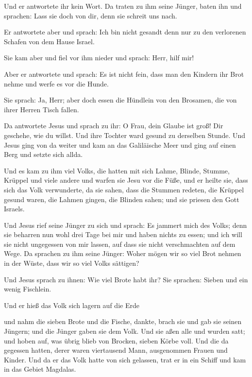  Und er antwortete ihr kein Wort. Da traten zu ihm seine
Jünger, baten ihn und sprachen: Lass sie doch von dir, denn sie schreit
uns nach.

 Er antwortete aber und sprach: Ich bin nicht gesandt
denn nur zu den verlorenen Schafen von dem Hause Israel.

 Sie kam aber und fiel vor ihm nieder und sprach: Herr,
hilf mir!

 Aber er antwortete und sprach: Es ist nicht fein, dass
man den Kindern ihr Brot nehme und werfe es vor die Hunde.

 Sie sprach: Ja, Herr; aber doch essen die Hündlein von
den Brosamen, die von ihrer Herren Tisch fallen.

 Da antwortete Jesus und sprach zu ihr: O Frau, dein
Glaube ist groß! Dir geschehe, wie du willst. Und ihre Tochter ward
gesund zu derselben Stunde.  Und Jesus ging von da weiter
und kam an das Galiläische Meer und ging auf einen Berg und setzte sich
allda.

 Und es kam zu ihm viel Volks, die hatten mit sich Lahme,
Blinde, Stumme, Krüppel und viele andere und warfen sie Jesu vor die
Füße, und er heilte sie,  dass sich das Volk verwunderte,
da sie sahen, dass die Stummen redeten, die Krüppel gesund waren, die
Lahmen gingen, die Blinden sahen; und sie priesen den Gott Israels.

 Und Jesus rief seine Jünger zu sich und sprach: Es
jammert mich des Volks; denn sie beharren nun wohl drei Tage bei mir und
haben nichts zu essen; und ich will sie nicht ungegessen von mir lassen,
auf dass sie nicht verschmachten auf dem Wege.  Da
sprachen zu ihm seine Jünger: Woher mögen wir so viel Brot nehmen in der
Wüste, dass wir so viel Volks sättigen?

 Und Jesus sprach zu ihnen: Wie viel Brote habt ihr? Sie
sprachen: Sieben und ein wenig Fischlein.

 Und er hieß das Volk sich lagern auf die Erde

 und nahm die sieben Brote und die Fische, dankte, brach
sie und gab sie seinen Jüngern; und die Jünger gaben sie dem Volk.
 Und sie aßen alle und wurden satt; und hoben auf, was
übrig blieb von Brocken, sieben Körbe voll.  Und die da
gegessen hatten, derer waren viertausend Mann, ausgenommen Frauen und
Kinder.  Und da er das Volk hatte von sich gelassen, trat
er in ein Schiff und kam in das Gebiet Magdalas.

